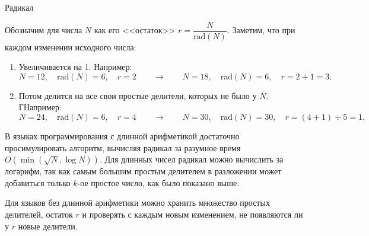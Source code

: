 \begin{tutorial}{Радикал}

Обозначим для числа $N$ как его <<остаток>> $r=\dfrac{N}{\text{rad}(N)}$. Заметим, что при каждом изменении исходного числа:
\begin{enumerate}
\item Увеличивается на 1. Например:
$$N=12,\quad \text{rad}(N)=6,\quad r=2\qquad\rightarrow\qquad N=18,\quad \text{rad}(N)=6,\quad r=2+1=3.$$
\item Потом делится на все свои простые делители, которых не было у $N$. ГНапример:
$$N=24,\quad \text{rad}(N)=6,\quad r=4\qquad\rightarrow\qquad N=30,\quad \text{rad}(N)=30,\quad r=(4 + 1) \div 5=1.$$
\end{enumerate}

В языках программирования с длинной арифметикой достаточно просимулировать алгоритм, вычисляя радикал за разумное время $O(\min(\sqrt{N},\log{N}))$. Для длинных чисел радикал можно вычислить за логарифм, так как самым большим простым делителем в разложении может добавиться только $k$-ое простое число, как было показано выше.

Для языков без длинной арифметики можно хранить множество простых делителей, остаток $r$ и проверять с каждым новым изменением, не появляются ли у $r$ новые делители.

\end{tutorial}
